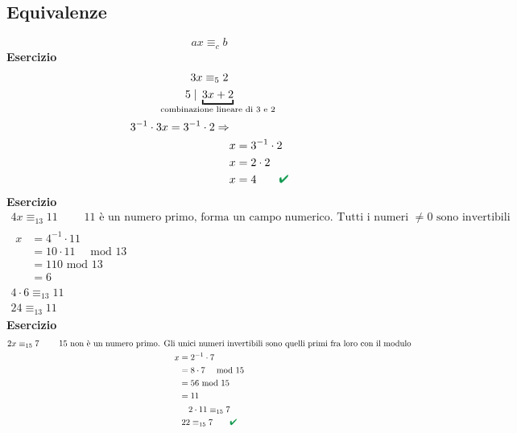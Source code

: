 \documentclass[italian]{article}
\newcommand{\mmod}{\text{ mod }}
\newcommand{\divides}[2]{\text{$#1 \;|\; #2$}}
\renewcommand{\checkmark}{\textcolor{ForestGreen}{\text{$\qquad$\ding{52}}}}
\begin{document}
\subsection{Equivalenze}
\[ax \equiv_c b\]
\textbf{Esercizio}
\begin{gather*}
	3x \equiv_5 2\\
	\divides{5}{\underbracket{3x+2}_{\mathclap{\text{combinazione lineare di 3 e 2}}}}\\[1mm]
	\begin{split}
		3^{-1}\cdot 3x = 3^{-1}\cdot 2 \Rightarrow &\\
		& x = 3^{-1}\cdot 2 \\
		&x = 2\cdot 2 \\
		& x=4 \checkmark
	\end{split}
\end{gather*}
\textbf{Esercizio}
\begin{gather*}
	4x \equiv_{13} 11 \qquad \text{ 11 è un numero primo, forma un campo numerico. Tutti i numeri $\neq 0$ sono invertibili}\\
	\begin{split}
		x &= 4^{-1} \cdot 11 \\
		&= 10 \cdot 11 \quad \mmod 13\\
		&= 110 \mmod 13 \\
		&= 6
	\end{split}\\
	4\cdot 6 \equiv_{13} 11\\
	24 \equiv_{13} 11
\end{gather*}
\textbf{Esercizio}
\begin{gather*}
	2x \equiv_{15} 7 \qquad \text{ 15 non è un numero primo. Gli unici numeri invertibili sono quelli primi fra loro con il modulo} \\
	\begin{split}
		x &= 2^{-1} \cdot 7 \\
		&= 8 \cdot 7 \quad \mmod 15\\
		&= 56 \mmod 15 \\
		&= 11
	\end{split}\\
	2\cdot 11 \equiv_{15} 7\\
	22 \equiv_{15} 7 \checkmark
\end{gather*}

\newpage
\end{document}
